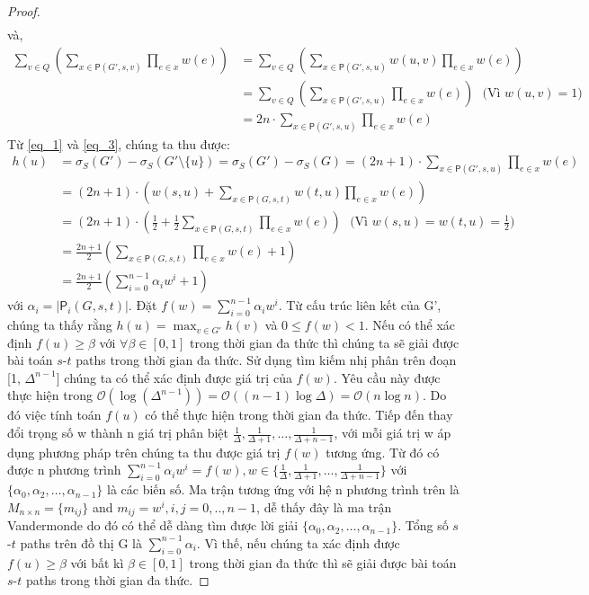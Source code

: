 \begin{proof}
\begin{align}
	\label{eq_1}
	\end{align}  
	và, 
	\begin{align}
	\sum_{v \in  Q } \left(  \sum_{x \in \mathsf{P}(G', s, v)} \prod_{e \in x}w(e)  \right) &= \sum_{v \in Q} \left(  \sum_{x \in \mathsf{P}(G', s, u)} w(u, v)  \prod_{e \in x}w(e)  \right) \nonumber
	\\
	& =\sum_{v \in Q} \left(  \sum_{x \in \mathsf{P}(G', s, u)} \prod_{e \in x}w(e)  \right)\ \ \ \mbox{(Vì $w(u, v)=1$)} \nonumber
	\\
	& = 2n \cdot \sum_{x \in \mathsf{P}(G', s, u)} \prod_{e \in x}w(e)
	\label{eq_3}
	\end{align}
	Từ \eqref{eq_1} và \eqref{eq_3}, chúng ta thu được:
	\begin{align}
	h(u)&= \sigma_{S}(G')- \sigma_{S}(G'\setminus \{u\})=  \sigma_{S}(G')- \sigma_{S}(G)=(2n+1)\cdot \sum_{x \in \mathsf{P}(G', s, u)} \prod_{e \in x}w(e)
	\\
	& = (2n+1)\cdot \left(  w(s, u)+ \sum_{x \in \mathsf{P}(G, s, t)} w(t, u) \prod_{e \in x}w(e) \right) 
	\\
	& = (2n+1)\cdot \left(  \frac{1}{2}+ \frac{1}{2} \sum_{x \in \mathsf{P}(G, s, t)}  \prod_{e \in x}w(e) \right)  \ \ \ \mbox{(Vì $w(s, u)= w(t, u)=\frac{1}{2}$)}
	\\
	& = \frac{2n+1}{2} \left(  \sum_{x \in \mathsf{P}(G, s, t)}  \prod_{e \in x}w(e) +1 \right) 
	\\
	& = \frac{2n+1}{2} \left(  \sum_{i=0}^{n-1} \alpha_i w^i +1 \right) 
	\end{align}   		
	với $\alpha_i=|\mathsf{P}_i(G, s, t)|$. Đặt $f(w)=\sum_{i=0}^{n-1}\alpha_i w^i$. Từ cấu trúc liên kết của G', chúng ta thấy rằng $h(u)=\max_{v \in G'}h(v)$ và $0 \leq  f(w) < 1$. Nếu có thể xác định $f(u) \geq \beta$ với $\forall \beta \in [0, 1]$ trong thời gian đa thức thì chúng ta sẽ giải được bài toán $s$-$t$ paths trong thời gian đa thức. Sử dụng tìm kiếm nhị phân trên đoạn [1, $\Delta^{n-1}$] chúng ta có thể xác định được giá trị của $f(w)$. Yêu cầu này được thực hiện trong $\mathcal{O}(\log(\Delta^{n-1}))=\mathcal{O}((n-1)\log\Delta) =\mathcal{O}(n\log n)$. Do đó việc tính toán $f(u)$ có thể thực hiện trong thời gian đa thức. Tiếp đến thay đổi trọng số w thành n giá trị phân biệt $\frac{1}{\Delta}, \frac{1}{\Delta+1}, \ldots, \frac{1}{\Delta+n-1}$, với mỗi giá trị w áp dụng phương pháp trên chúng ta thu được giá trị $f(w)$ tương ứng. Từ đó có được n phương trình $\sum_{i=0}^{n-1}\alpha_i w^i =f(w), w \in \{\frac{1}{\Delta}, \frac{1}{\Delta+1}, \ldots, \frac{1}{\Delta+n-1} \}$ với $\{\alpha_0, \alpha_2, \ldots, \alpha_{n-1}\}$ là các biến số. Ma trận tương ứng với hệ n phương trình trên là $M_{n \times n}=\{m_{ij}\}$ and $m_{ij}=w^{i} , i,j=0,..,n-1$, dễ thấy đây là ma trận Vandermonde do đó có thể dễ dàng tìm được lời giải $\{\alpha_0, \alpha_2, \ldots, \alpha_{n-1}\}$. Tổng số $s$-$t$ paths trên đồ thị G là $\sum_{i=0}^{n-1} \alpha_i$. Vì thế, nếu chúng ta xác định được $f(u) \geq \beta$ với bất kì $\beta \in [0, 1]$ trong thời gian đa thức thì sẽ giải được bài toán $s$-$t$ paths trong thời gian đa thức. 
	

\end{proof}
